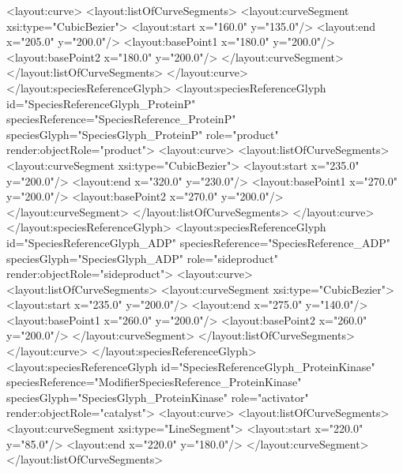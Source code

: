 {\begin{example}
        <layout:curve>
         <layout:listOfCurveSegments>
          <layout:curveSegment xsi:type="CubicBezier">
           <layout:start x="160.0" y="135.0"/>
           <layout:end x="205.0" y="200.0"/>
           <layout:basePoint1 x="180.0" y="200.0"/>
           <layout:basePoint2 x="180.0" y="200.0"/>
          </layout:curveSegment>
         </layout:listOfCurveSegments>
        </layout:curve>
       </layout:speciesReferenceGlyph>
       <layout:speciesReferenceGlyph id="SpeciesReferenceGlyph_ProteinP"
                              speciesReference="SpeciesReference_ProteinP"
                              speciesGlyph="SpeciesGlyph_ProteinP"
                              role="product" 
                              render:objectRole="product">
        <layout:curve>
         <layout:listOfCurveSegments>
          <layout:curveSegment xsi:type="CubicBezier">
           <layout:start x="235.0" y="200.0"/>
           <layout:end x="320.0" y="230.0"/>
           <layout:basePoint1 x="270.0" y="200.0"/>
           <layout:basePoint2 x="270.0" y="200.0"/>
          </layout:curveSegment>
         </layout:listOfCurveSegments>
        </layout:curve>
       </layout:speciesReferenceGlyph>
       <layout:speciesReferenceGlyph id="SpeciesReferenceGlyph_ADP"
                              speciesReference="SpeciesReference_ADP" 
                              speciesGlyph="SpeciesGlyph_ADP"
                              role="sideproduct" 
                              render:objectRole="sideproduct">
        <layout:curve>
         <layout:listOfCurveSegments>
          <layout:curveSegment xsi:type="CubicBezier">
           <layout:start x="235.0" y="200.0"/>
           <layout:end x="275.0" y="140.0"/>
           <layout:basePoint1 x="260.0" y="200.0"/>
           <layout:basePoint2 x="260.0" y="200.0"/>
          </layout:curveSegment>
         </layout:listOfCurveSegments>
        </layout:curve>
       </layout:speciesReferenceGlyph>
       <layout:speciesReferenceGlyph id="SpeciesReferenceGlyph_ProteinKinase" 
                              speciesReference="ModifierSpeciesReference_ProteinKinase"
                              speciesGlyph="SpeciesGlyph_ProteinKinase" 
                              role="activator" 
                              render:objectRole="catalyst">
        <layout:curve>
         <layout:listOfCurveSegments>
          <layout:curveSegment xsi:type="LineSegment">
           <layout:start x="220.0" y="85.0"/>
           <layout:end x="220.0" y="180.0"/>
          </layout:curveSegment>
         </layout:listOfCurveSegments>

\end{example}}
